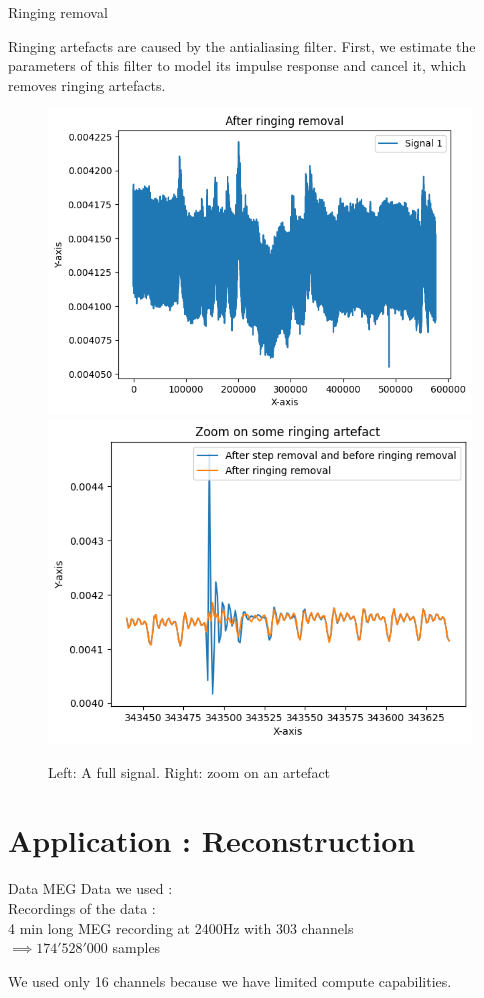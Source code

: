\documentclass[10pt,serif]{beamer}
\begin{document}
\begin{frame}{Ringing removal}

    Ringing artefacts are caused by the antialiasing filter. First, we estimate the parameters of this filter to model its impulse response and cancel it, which removes ringing artefacts.
    \begin{figure}
        \centering
        \includegraphics[width=.4\textwidth]{figures/ringing_removal_real.png}
        \includegraphics[width=.4\textwidth]{figures/ringin_removal_zoom.png}
        \caption{Left: A full signal. Right: zoom on an artefact}
        \label{fig:data}
    \end{figure}
\end{frame}


\section[\color{white} Application]{Application : Reconstruction}\label{sec:results}

\begin{frame}{Data}
    MEG Data we used : \textcite{Litvak2016}\\
    Recordings of the data : \textcite{oswal2016analysis}\\
    4 min long MEG recording at 2400Hz with 303 channels\\$\implies 174'528'000$ samples

    We used only 16 channels because we have limited compute capabilities.
\end{frame}
\end{document}
